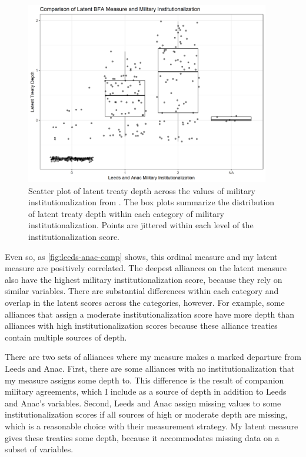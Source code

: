 \documentclass[12pt]{article}
\begin{document}
\begin{figure}[htbp]
	\centering
		\includegraphics[width=0.95\textwidth]{leeds-anac-comp.png}
	\caption{Scatter plot of latent treaty depth across the values of military institutionalization from \citet{LeedsAnac2005}. The box plots summarize the distribution of latent treaty depth within each category of military institutionalization. Points are jittered within each level of the institutionalization score.}
	\label{fig:leeds-anac-comp}
\end{figure}


Even so, as \autoref{fig:leeds-anac-comp} shows, this ordinal measure and my latent measure are positively correlated. 
The deepest alliances on the latent measure also have the highest military institutionalization score, because they rely on similar variables. 
There are substantial differences within each category and overlap in the latent scores across the categories, however. 
For example, some alliances that \citet{LeedsAnac2005} assign a moderate institutionalization score have more depth than alliances with high institutionalization scores because these alliance treaties contain multiple sources of depth. 


There are two sets of alliances where my measure makes a marked departure from Leeds and Anac. 
First, there are some alliances with no institutionalization that my measure assigns some depth to. 
This difference is the result of companion military agreements, which I include as a source of depth in addition to Leeds and Anac's variables. 
Second, Leeds and Anac assign missing values to some institutionalization scores if all sources of high or moderate depth are missing, which is a reasonable choice with their measurement strategy.
My latent measure gives these treaties some depth, because it accommodates missing data on a subset of variables. 
\end{document}
